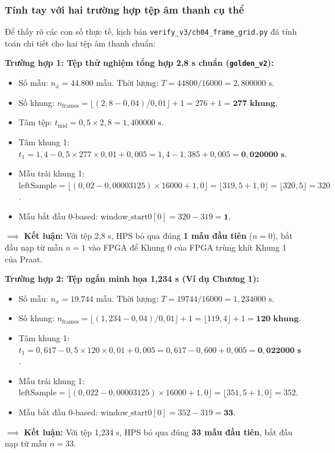 \subsubsection*{Tính tay với hai trường hợp tệp âm thanh cụ thể}
Để thấy rõ các con số thực tế, kịch bản \texttt{verify\_v3/ch04\_frame\_grid.py} đã tính toán chi tiết cho hai tệp âm thanh chuẩn:

\textbf{Trường hợp 1: Tệp thử nghiệm tổng hợp 2,8 s chuẩn (\texttt{golden\_v2}):}
\begin{itemize}[leftmargin=1.5em, itemsep=2pt]
    \item Số mẫu: $n_x = 44.800$ mẫu. Thời lượng: $T = 44800 / 16000 = 2{,}800000\text{ s}$.
    \item Số khung: $n_{\text{frames}} = \lfloor (2{,}8 - 0{,}04) / 0{,}01 \rfloor + 1 = 276 + 1 = \mathbf{277\text{ khung}}$.
    \item Tâm tệp: $t_{\text{mid}} = 0{,}5 \times 2{,}8 = 1{,}400000\text{ s}$.
    \item Tâm khung 1: $t_1 = 1{,}4 - 0{,}5 \times 277 \times 0{,}01 + 0{,}005 = 1{,}4 - 1{,}385 + 0{,}005 = \mathbf{0{,}020000\text{ s}}$.
    \item Mẫu trái khung 1: $\text{leftSample} = \lfloor (0{,}02 - 0{,}00003125) \times 16000 + 1{,}0 \rfloor = \lfloor 319{,}5 + 1{,}0 \rfloor = \lfloor 320{,}5 \rfloor = 320$.
    \item Mẫu bắt đầu 0-based: $\text{window\_start0}[0] = 320 - 319 = \mathbf{1}$.
\end{itemize}
$\implies$ \textbf{Kết luận:} Với tệp 2,8 s, HPS bỏ qua đúng \textbf{1 mẫu đầu tiên} ($n = 0$), bắt đầu nạp từ mẫu $n = 1$ vào FPGA để Khung 0 của FPGA trùng khít Khung 1 của Praat.

\textbf{Trường hợp 2: Tệp ngắn minh họa 1,234 s (Ví dụ Chương 1):}
\begin{itemize}[leftmargin=1.5em, itemsep=2pt]
    \item Số mẫu: $n_x = 19.744$ mẫu. Thời lượng: $T = 19744 / 16000 = 1{,}234000\text{ s}$.
    \item Số khung: $n_{\text{frames}} = \lfloor (1{,}234 - 0{,}04) / 0{,}01 \rfloor + 1 = \lfloor 119{,}4 \rfloor + 1 = \mathbf{120\text{ khung}}$.
    \item Tâm khung 1: $t_1 = 0{,}617 - 0{,}5 \times 120 \times 0{,}01 + 0{,}005 = 0{,}617 - 0{,}600 + 0{,}005 = \mathbf{0{,}022000\text{ s}}$.
    \item Mẫu trái khung 1: $\text{leftSample} = \lfloor (0{,}022 - 0{,}00003125) \times 16000 + 1{,}0 \rfloor = \lfloor 351{,}5 + 1{,}0 \rfloor = 352$.
    \item Mẫu bắt đầu 0-based: $\text{window\_start0}[0] = 352 - 319 = \mathbf{33}$.
\end{itemize}
$\implies$ \textbf{Kết luận:} Với tệp 1,234 s, HPS bỏ qua đúng \textbf{33 mẫu đầu tiên}, bắt đầu nạp từ mẫu $n = 33$.

